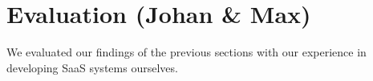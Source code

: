 \section{Evaluation (Johan \& Max)}

We evaluated our findings of the previous sections with our experience in developing SaaS systems ourselves.
